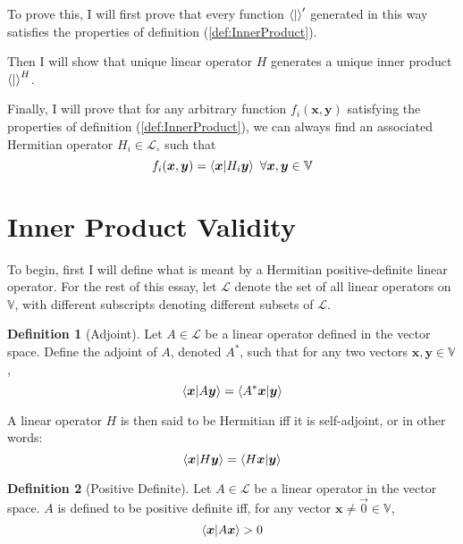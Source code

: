\documentclass{article}
\newcommand{\B}[1]{\boldsymbol{#1}}
\theoremstyle{definition}
\newtheorem{definition}{Definition}[section]
\theoremstyle{remark}
\begin{document}
To prove this, I will first prove that every function $\braket{|}^\prime$ generated
in this way satisfies the properties of definition (\ref{def:InnerProduct}).

Then I will show that unique linear operator $H$ generates a unique inner product $\braket{|}^H$.

Finally, I will prove that for any arbitrary function $f_i(\B{x}, \B{y})$ satisfying
the properties of definition (\ref{def:InnerProduct}), we can always find an associated
Hermitian operator $H_i \in \mathcal{L}_\circ$ such that
\begin{equation}
  f_i(\B{x},\B{y}) = \braket{\B{x}|H_i\B{y}} ~ \forall \B{x}, \B{y} \in \mathbb{V}
\end{equation}

\pagebreak
\section{Inner Product Validity}

To begin, first I will define what is meant by a Hermitian positive-definite linear operator.
For the rest of this essay, let $\mathcal{L}$ denote the set of all linear operators on $\mathbb{V}$, with 
different subscripts denoting different subsets of $\mathcal{L}$.

\begin{definition}[Adjoint]
  Let $A \in \mathcal{L}$ be a linear operator defined in the vector space. Define the adjoint
  of $A$, denoted $A^*$, such that for any two vectors $\B{x}, \B{y} \in \mathbb{V}$,
  \begin{equation}
    \braket{\B{x}|A\B{y}} = \braket{A^* \B{x} | \B{y}} \label{eq:defAdjoint}
  \end{equation}
  
  A linear operator $H$ is then said to be Hermitian iff it is self-adjoint, or in other words:
  \begin{equation}
    \braket{\B{x}|H\B{y}} = \braket{H\B{x} | \B{y}} \label{eq:defHermitian}
  \end{equation}
  \label{def:Hermitian}
\end{definition}

\begin{definition}[Positive Definite]
  Let $A \in \mathcal{L}$ be a linear operator in the vector space. $A$ is defined to 
  be positive definite iff, for any vector $\B{x} \neq \vec{0} \in \mathbb{V}$, 
  \begin{equation}
    \braket{\B{x}|A\B{x}} > 0 \label{eq:positiveDefinite}
  \end{equation}
\end{definition}
\end{document}
